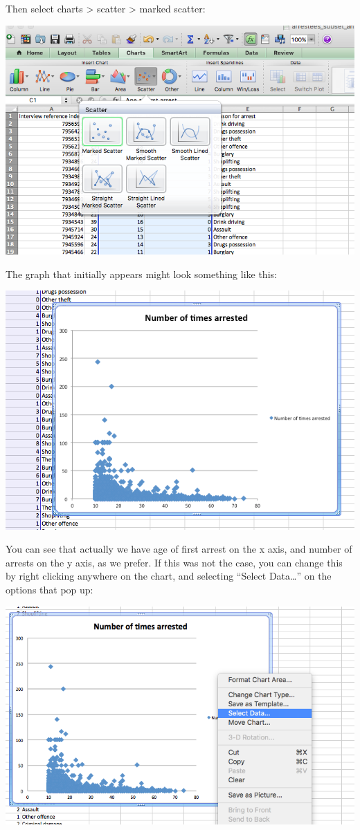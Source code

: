 \documentclass[]{book}
\theoremstyle{definition}
\theoremstyle{definition}
\theoremstyle{definition}
\theoremstyle{remark}
\begin{document}
Then select charts \textgreater{} scatter \textgreater{} marked scatter:

\includegraphics{imgs/scatter_2.png}

The graph that initially appears might look something like this:

\includegraphics{imgs/scatter_3.png}

You can see that actually we have age of first arrest on the x axis, and
number of arrests on the y axis, as we prefer. If this was not the case,
you can change this by right clicking anywhere on the chart, and
selecting ``Select Data\ldots{}'' on the options that pop up:

\includegraphics{imgs/scatter_4.png}
\end{document}
